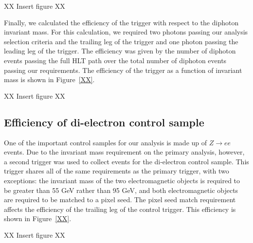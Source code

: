 XX Insert figure XX

Finally, we calculated the efficiency of the trigger with respect to the diphoton invariant mass. For this calculation, we required two photons passing our analysis selection criteria and the trailing leg of the trigger and one photon passing the leading leg of the trigger. The efficiency was given by the number of diphoton events passing the full HLT path over the total number of diphoton events passing our requirements. The efficiency of the trigger as a function of invariant mass is shown in Figure~\ref{XX}.

XX Insert figure XX

\subsection{Efficiency of di-electron control sample}
\label{sec:eeEff}
One of the important control samples for our analysis is made up of $Z\rightarrow ee$ events. Due to the invariant mass requirement on the primary analysis, however, a second trigger was used to collect events for the di-electron control sample. This trigger shares all of the same requirements as the primary trigger, with two exceptions: the invariant mass of the two electromagnetic objects is required to be greater than 55 GeV rather than 95 GeV, and both electromagnetic objects are required to be matched to a pixel seed. The pixel seed match requirement affects the efficiency of the trailing leg of the control trigger. This efficiency is shown in Figure~\ref{XX}.

XX Insert figure XX


